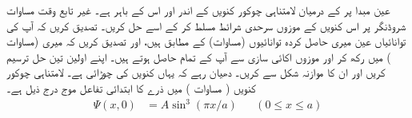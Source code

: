 عین مبدا پر  کے درمیان  لامتناہی چوکور کنویں کے اندر اور اس کے باہر ہے۔ غیر تابع وقت مساوات شروڈنگر پر اس کنویں کے   موزوں سرحدی شرائط مسلط کر کے اسے حل کریں۔ تصدیق کریں کہ آپ کی توانائیاں عین میری حاصل کردہ توانائیوں (مساوات) کے مطابق ہیں،  اور تصدیق کریں کہ میری  (مساوات ) میں   رکھ کر اور  موزوں اکائی سازی سے آپ کے  تمام  حاصل ہوتے  ہیں۔ اپنے اولین تین حل ترسیم کریں اور ان کا موازنہ شکل  سے کریں۔ دھیان رہے کہ یہاں کنویں کی چوڑائی   ہے۔ 
 لامتناہی چوکور کنویں ( مساوات ) میں  ذرے کا ابتدائی تفاعل موج درج ذیل ہے۔
 \begin{align*}
 \Psi(x,0)&=A\sin^{3}(\pi x/a) && (0\le x\le a)
\end{align*}

